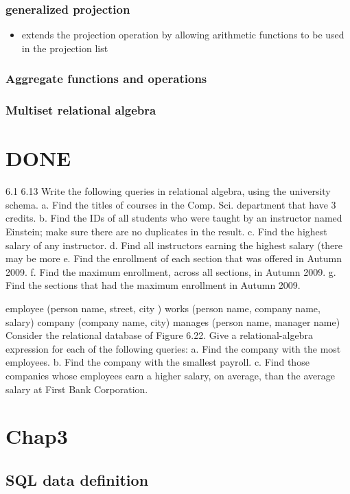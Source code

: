 \documentclass[11pt]{article}
\begin{document}
\subsubsection{generalized projection}
\label{sec-4-2-1}
\begin{itemize}
\item extends the projection operation by allowing arithmetic functions to be
used in the projection list
\end{itemize}
\subsubsection{Aggregate functions and operations}
\label{sec-4-2-2}
\subsubsection{Multiset relational algebra}
\label{sec-4-2-3}
\section{{\bfseries\sffamily DONE} }
\label{sec-5}
  6.1 6.13
Write the following queries in relational algebra, using the university
schema.
a. Find the titles of courses in the Comp. Sci. department that have 3
credits.
b. Find the IDs of all students who were taught by an instructor named
Einstein; make sure there are no duplicates in the result.
c. Find the highest salary of any instructor.
d. Find all instructors earning the highest salary (there may be more
e. Find the enrollment of each section that was offered in Autumn 2009.
f. Find the maximum enrollment, across all sections, in Autumn 2009.
g. Find the sections that had the maximum enrollment in Autumn 2009.


employee (person name, street, city )
works (person name, company name, salary)
company (company name, city)
manages (person name, manager name)
Consider the relational database of Figure 6.22. Give a relational-algebra
expression for each of the following queries:
a. Find the company with the most employees.
b. Find the company with the smallest payroll.
c. Find those companies whose employees earn a higher salary, on average, than
the average salary at First Bank Corporation.
\section{Chap3}
\label{sec-6}
\subsection{SQL data definition}
\label{sec-6-1}
\end{document}
